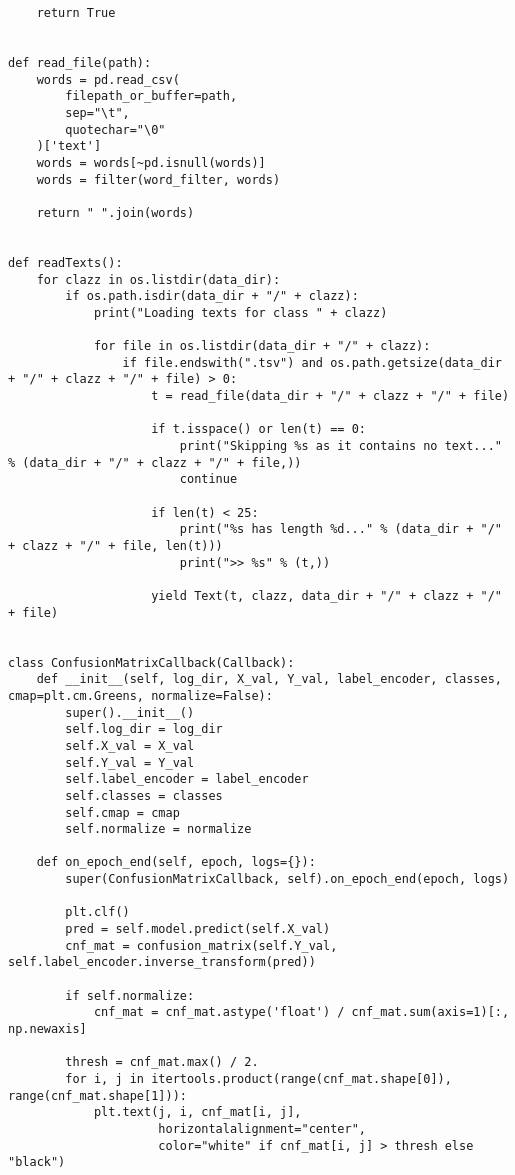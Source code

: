 \begin{verbatim}
    return True


def read_file(path):
    words = pd.read_csv(
        filepath_or_buffer=path,
        sep="\t",
        quotechar="\0"
    )['text']
    words = words[~pd.isnull(words)]
    words = filter(word_filter, words)

    return " ".join(words)


def readTexts():
    for clazz in os.listdir(data_dir):
        if os.path.isdir(data_dir + "/" + clazz):
            print("Loading texts for class " + clazz)

            for file in os.listdir(data_dir + "/" + clazz):
                if file.endswith(".tsv") and os.path.getsize(data_dir + "/" + clazz + "/" + file) > 0:
                    t = read_file(data_dir + "/" + clazz + "/" + file)

                    if t.isspace() or len(t) == 0:
                        print("Skipping %s as it contains no text..." % (data_dir + "/" + clazz + "/" + file,))
                        continue

                    if len(t) < 25:
                        print("%s has length %d..." % (data_dir + "/" + clazz + "/" + file, len(t)))
                        print(">> %s" % (t,))

                    yield Text(t, clazz, data_dir + "/" + clazz + "/" + file)


class ConfusionMatrixCallback(Callback):
    def __init__(self, log_dir, X_val, Y_val, label_encoder, classes, cmap=plt.cm.Greens, normalize=False):
        super().__init__()
        self.log_dir = log_dir
        self.X_val = X_val
        self.Y_val = Y_val
        self.label_encoder = label_encoder
        self.classes = classes
        self.cmap = cmap
        self.normalize = normalize

    def on_epoch_end(self, epoch, logs={}):
        super(ConfusionMatrixCallback, self).on_epoch_end(epoch, logs)

        plt.clf()
        pred = self.model.predict(self.X_val)
        cnf_mat = confusion_matrix(self.Y_val, self.label_encoder.inverse_transform(pred))

        if self.normalize:
            cnf_mat = cnf_mat.astype('float') / cnf_mat.sum(axis=1)[:, np.newaxis]

        thresh = cnf_mat.max() / 2.
        for i, j in itertools.product(range(cnf_mat.shape[0]), range(cnf_mat.shape[1])):
            plt.text(j, i, cnf_mat[i, j],
                     horizontalalignment="center",
                     color="white" if cnf_mat[i, j] > thresh else "black")


\end{verbatim}
